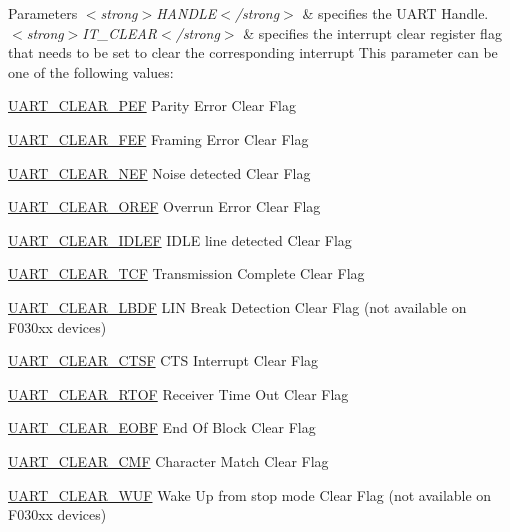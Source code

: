 \begin{DoxyParams}{Parameters}
{\em $<$strong$>$\+H\+A\+N\+D\+L\+E$<$/strong$>$} & specifies the U\+A\+RT Handle. \\
\hline
{\em $<$strong$>$\+I\+T\+\_\+\+C\+L\+E\+A\+R$<$/strong$>$} & specifies the interrupt clear register flag that needs to be set to clear the corresponding interrupt This parameter can be one of the following values\+: \begin{DoxyItemize}
\item \hyperlink{group___u_a_r_t___i_t___c_l_e_a_r___flags_ga9c2aef8048dd09ea5e72d69c63026f02}{U\+A\+R\+T\+\_\+\+C\+L\+E\+A\+R\+\_\+\+P\+EF} Parity Error Clear Flag \item \hyperlink{group___u_a_r_t___i_t___c_l_e_a_r___flags_ga2040edf7a1daa2e9f352364e285ef5c3}{U\+A\+R\+T\+\_\+\+C\+L\+E\+A\+R\+\_\+\+F\+EF} Framing Error Clear Flag \item \hyperlink{group___u_a_r_t___i_t___c_l_e_a_r___flags_gad5b9aafb495296d917a5d85e63383396}{U\+A\+R\+T\+\_\+\+C\+L\+E\+A\+R\+\_\+\+N\+EF} Noise detected Clear Flag \item \hyperlink{group___u_a_r_t___i_t___c_l_e_a_r___flags_ga3bc97b70293f9a7bf8cc21a74094afad}{U\+A\+R\+T\+\_\+\+C\+L\+E\+A\+R\+\_\+\+O\+R\+EF} Overrun Error Clear Flag \item \hyperlink{group___u_a_r_t___i_t___c_l_e_a_r___flags_ga75ee9be0ac2236931ef3d9514e7dedf4}{U\+A\+R\+T\+\_\+\+C\+L\+E\+A\+R\+\_\+\+I\+D\+L\+EF} I\+D\+LE line detected Clear Flag \item \hyperlink{group___u_a_r_t___i_t___c_l_e_a_r___flags_gadfbfe4df408d1d09ff2adc1ddad3de09}{U\+A\+R\+T\+\_\+\+C\+L\+E\+A\+R\+\_\+\+T\+CF} Transmission Complete Clear Flag \item \hyperlink{group___u_a_r_t___i_t___c_l_e_a_r___flags_ga030414d9a93ad994156210644634b73c}{U\+A\+R\+T\+\_\+\+C\+L\+E\+A\+R\+\_\+\+L\+B\+DF} L\+IN Break Detection Clear Flag (not available on F030xx devices) \item \hyperlink{group___u_a_r_t___i_t___c_l_e_a_r___flags_gabe0f3bc774ad0b9319732da3be8374cf}{U\+A\+R\+T\+\_\+\+C\+L\+E\+A\+R\+\_\+\+C\+T\+SF} C\+TS Interrupt Clear Flag \item \hyperlink{group___u_a_r_t___i_t___c_l_e_a_r___flags_ga2735a415d2c7930fdf2818943fd7ddd2}{U\+A\+R\+T\+\_\+\+C\+L\+E\+A\+R\+\_\+\+R\+T\+OF} Receiver Time Out Clear Flag \item \hyperlink{group___u_a_r_t___i_t___c_l_e_a_r___flags_gaa603f7ce051b012045da4d7e665d6ac6}{U\+A\+R\+T\+\_\+\+C\+L\+E\+A\+R\+\_\+\+E\+O\+BF} End Of Block Clear Flag \item \hyperlink{group___u_a_r_t___i_t___c_l_e_a_r___flags_ga5815698abf54d69b752bd2c43c2d6ad3}{U\+A\+R\+T\+\_\+\+C\+L\+E\+A\+R\+\_\+\+C\+MF} Character Match Clear Flag \item \hyperlink{group___u_a_r_t___i_t___c_l_e_a_r___flags_ga5081c579f9956a7712248430f3fe129b}{U\+A\+R\+T\+\_\+\+C\+L\+E\+A\+R\+\_\+\+W\+UF} Wake Up from stop mode Clear Flag (not available on F030xx devices) \end{DoxyItemize}
\\
\hline
\end{DoxyParams}


